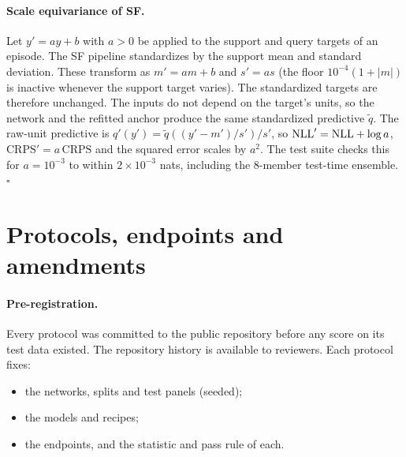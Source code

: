 \paragraph{Scale equivariance of SF.}
Let $y'=ay+b$ with $a>0$ be applied to the support and query targets of an episode. The SF pipeline standardizes by
the support mean and standard deviation. These transform as $m'=am+b$ and $s'=as$ (the floor
$10^{-4}(1+|m|)$ is inactive whenever the support target varies). The standardized targets are therefore unchanged.
The inputs do not depend on the target's units, so the network and the refitted anchor produce the same standardized
predictive $\tilde q$. The raw-unit predictive is $q'(y')=\tilde q((y'-m')/s')/s'$, so
$\mathrm{NLL}'=\mathrm{NLL}+\log a$, $\mathrm{CRPS}'=a\,\mathrm{CRPS}$ and the squared error scales by $a^2$. The test suite checks this
for $a=10^{-3}$ to within $2\times10^{-3}$ nats, including the 8-member test-time ensemble. \hfill$\square$



\section{Protocols, endpoints and amendments}
\label{app:protocols}

\paragraph{Pre-registration.} Every protocol was committed to the public repository before any score on its test data
existed. The repository history is available to reviewers. Each protocol fixes:
\begin{itemize}
  \item the networks, splits and test panels (seeded);
  \item the models and recipes;
  \item the endpoints, and the statistic and pass rule of each.
\end{itemize}

